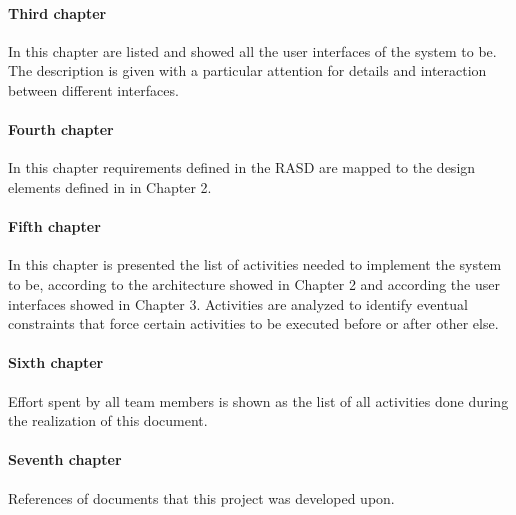 \documentclass[../DD.tex]{subfiles}
\begin{document}
		\paragraph{Third chapter}
			In this chapter are listed and showed all the user interfaces of the system to be. The description is given with a particular attention for details and interaction between different interfaces.
		\paragraph{Fourth chapter}
			In this chapter requirements defined in the RASD are mapped to the design elements defined in in Chapter 2.
		\paragraph{Fifth chapter}
			In this chapter is presented the list of activities needed to implement the system to be, according to the architecture showed in Chapter 2 and according the user interfaces showed in Chapter 3. Activities are analyzed to identify eventual constraints that force certain activities to be executed before or after other else.
		\paragraph{Sixth chapter}
			Effort spent by all team members is shown as the list of all activities done during the realization of this document.
		\paragraph{Seventh chapter}
			References of documents that this project was developed upon.
		
\end{document}

